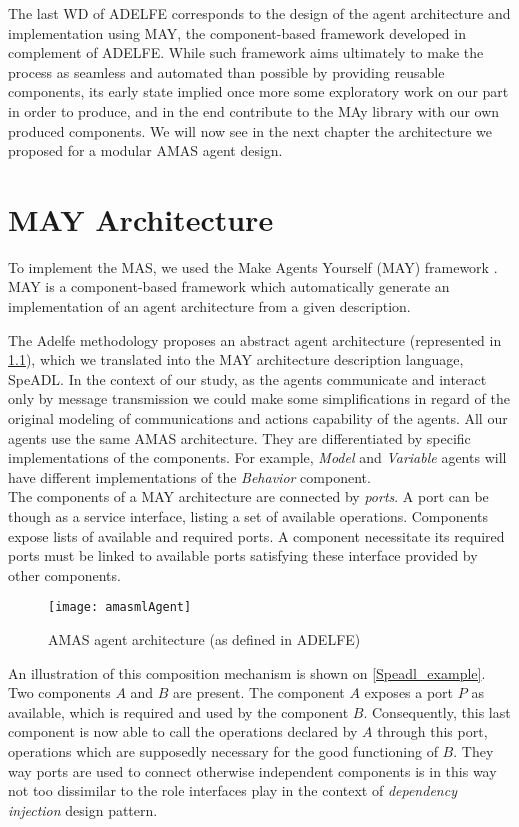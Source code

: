 The last WD of ADELFE corresponds to the design of the agent architecture and implementation using MAY, the component-based framework developed in complement of ADELFE. While such framework aims ultimately to make the process as seamless and  automated than possible by providing reusable components, its early state implied once more some exploratory work on our part in order to produce, and in the end contribute to the MAy library with our own produced components. We will now see in the next chapter the architecture we proposed for a modular AMAS agent design.

\chapter{MAY Architecture}

To implement the MAS, we used the Make Agents Yourself (MAY) framework  \cite{No2012.2}. MAY is a component-based framework which automatically generate an implementation of an agent architecture from a given description.

The Adelfe methodology proposes an abstract agent architecture (represented in \figurename{} \ref{AMAS-ML_agent}), which we translated into the MAY architecture description language, SpeADL. In the context of our study, as the agents communicate and interact only by message transmission we could make some simplifications in regard of the original modeling of communications and actions capability of the agents. All our agents use the same AMAS architecture. They are differentiated by specific implementations of the components. For example, \emph{Model} and \emph{Variable} agents will have different implementations of the \emph{Behavior} component.\\
The components of a MAY architecture are connected by \emph{ports}. A port can be though as a service interface, listing a set of available operations. Components expose lists of available and required ports. A component necessitate its required ports must be linked to available ports satisfying these interface provided by other components.

\begin{figure}
\centering
\texttt{[image: amasmlAgent]}
\caption{AMAS agent architecture (as defined in ADELFE)}\label{AMAS-ML_agent}
\end{figure}

An illustration of this composition mechanism is shown on \figurename{} \ref{Speadl_example}. Two components $A$ and $B$ are present. The component $A$ exposes a port $P$ as available, which is required and used by the component $B$. Consequently, this last component is now able to call the operations declared by $A$ through this port, operations which are supposedly necessary for the good functioning of $B$. They way ports are used to connect otherwise independent components is in this way not too dissimilar to the role interfaces play in the context of \emph{dependency injection} design pattern.

